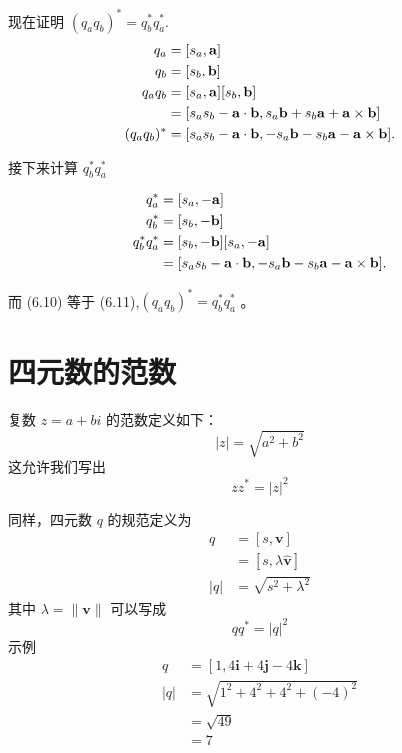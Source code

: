 现在证明 $\left(q_{a} q_{b}\right)^{*}=q_{b}^{*} q_{a}^{*}$.
\begin{align}
    q_{a}       & =[s_{a}, \mathbf{a}]  \notag\\
    q_{b}       & =[s_{b}, \mathbf{b}]  \notag\\
    q_{a} q_{b} & =[s_{a}, \mathbf{a}][s_{b}, \mathbf{b}]           \notag\\
                & =[s_{a} s_{b}-\mathbf{a} \cdot \mathbf{b}, s_{a} \mathbf{b}+s_{b} \mathbf{a}+\mathbf{a} \times \mathbf{b}]   \notag\\
    (q_{a} q_{b})^{*} & =[s_{a} s_{b}-\mathbf{a} \cdot \mathbf{b},-s_{a} \mathbf{b}-s_{b} \mathbf{a}-\mathbf{a} \times \mathbf{b}] .
\end{align}

接下来计算 $q_{b}^{*} q_{a}^{*}$


\begin{align}
    q_{a}^{*}           & =[s_{a},-\mathbf{a}] \notag\\
    q_{b}^{*}           & =[s_{b},-\mathbf{b}]   \notag \\
    q_{b}^{*} q_{a}^{*} & =[s_{b},-\mathbf{b}][s_{a},-\mathbf{a}] \notag\\
                        & =[s_{a} s_{b}-\mathbf{a} \cdot \mathbf{b},-s_{a} \mathbf{b}-s_{b} \mathbf{a}-\mathbf{a} \times \mathbf{b}] .
\end{align}

而 (6.10) 等于 (6.11),$(q_{a} q_{b})^{*}=q_{b}^{*} q_{a}^{*}$ 。

\section{四元数的范数}
复数 $z=a+b i$ 的范数定义如下：
$$
    |z|=\sqrt{a^{2}+b^{2}}
$$
这允许我们写出
$$
    z z^{*}=|z|^{2}
$$

同样，四元数 $q$ 的规范定义为
$$
    \begin{aligned}
        q   & =[s, \mathbf{v}]               \\
            & =[s, \lambda \hat{\mathbf{v}}] \\
        |q| & =\sqrt{s^{2}+\lambda^{2}}
    \end{aligned}
$$
其中 $\lambda=\|\mathbf{v}\|$ 可以写成
$$
    q q^{*}=|q|^{2}
$$
示例
$$
    \begin{aligned}
        q   & =[1,4 \mathbf{i}+4 \mathbf{j}-4 \mathbf{k}] \\
        |q| & =\sqrt{1^{2}+4^{2}+4^{2}+(-4)^{2}}          \\
            & =\sqrt{49}                                  \\
            & =7
    \end{aligned}
$$


